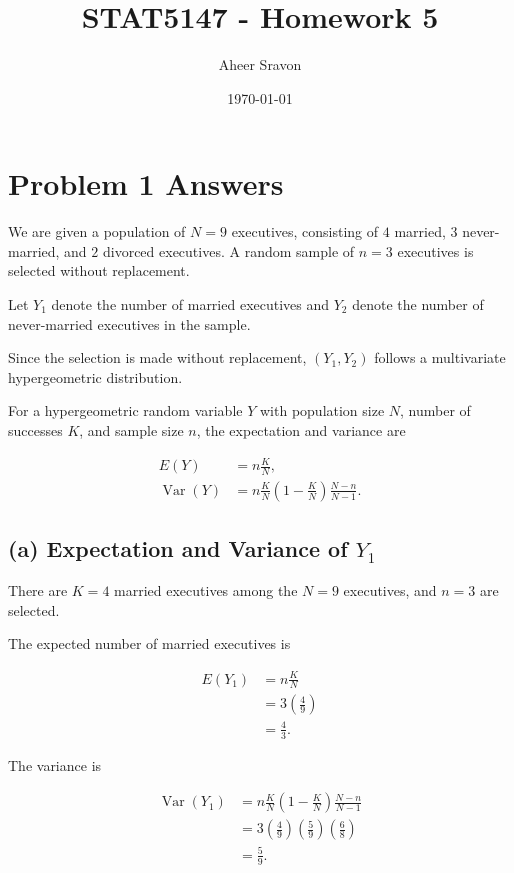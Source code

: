 \documentclass[11pt, a4paper]{article}
\title{\textbf{\color{primary}STAT5147 - Homework 5}}
\author{Aheer Sravon}
\date{\today}
\begin{document}
\maketitle


\section{Problem 1 Answers}

We are given a population of $N=9$ executives, consisting of
$4$ married, $3$ never-married, and $2$ divorced executives.
A random sample of $n=3$ executives is selected without
replacement.

Let $Y_1$ denote the number of married executives and
$Y_2$ denote the number of never-married executives
in the sample.

Since the selection is made without replacement,
$(Y_1,Y_2)$ follows a multivariate hypergeometric
distribution.

For a hypergeometric random variable $Y$ with population
size $N$, number of successes $K$, and sample size $n$,
the expectation and variance are

\begin{align*}
E(Y) &= n\frac{K}{N},\\
\operatorname{Var}(Y)
&= n\frac{K}{N}
\left(1-\frac{K}{N}\right)
\frac{N-n}{N-1}.
\end{align*}

\subsection{(a) Expectation and Variance of $Y_1$}

There are $K=4$ married executives among the $N=9$
executives, and $n=3$ are selected.

The expected number of married executives is

\begin{align*}
E(Y_1)
&= n\frac{K}{N}\\
&= 3\left(\frac{4}{9}\right)\\
&= \frac{4}{3}.
\end{align*}

The variance is

\begin{align*}
\operatorname{Var}(Y_1)
&= n\frac{K}{N}
\left(1-\frac{K}{N}\right)
\frac{N-n}{N-1}\\
&= 3\left(\frac{4}{9}\right)
\left(\frac{5}{9}\right)
\left(\frac{6}{8}\right)\\
&= \frac{5}{9}.
\end{align*}
\end{document}
